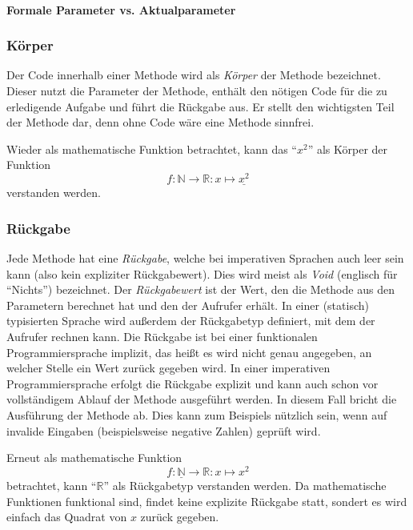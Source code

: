 		\paragraph{Formale Parameter vs. Aktualparameter}
	
	\subsubsection{Körper} \functionalMark \imperativeMark \oopMark
		Der Code innerhalb einer Methode wird als \textit{Körper} der Methode bezeichnet. Dieser nutzt die Parameter der Methode, enthält den nötigen Code für die zu erledigende Aufgabe und führt die Rückgabe aus. Er stellt den wichtigsten Teil der Methode dar, denn ohne Code wäre eine Methode sinnfrei.
		
		Wieder als mathematische Funktion betrachtet, kann das \enquote{\( x ^ 2 \)} als Körper der Funktion \[ f : \mathbb{N} \rightarrow \mathbb{R} : x \mapsto \underline{x ^ 2} \] verstanden werden.
	
	\subsubsection{Rückgabe} \functionalMark \imperativeMark \oopMark
		Jede Methode hat eine \textit{Rückgabe}, welche bei imperativen Sprachen auch leer sein kann (also kein expliziter Rückgabewert). Dies wird meist als \textit{Void} (englisch für \enquote{Nichts}) bezeichnet. Der \textit{Rückgabewert} ist der Wert, den die Methode aus den Parametern berechnet hat und den der Aufrufer erhält. In einer (statisch) typisierten Sprache wird außerdem der Rückgabetyp definiert, mit dem der Aufrufer rechnen kann. Die Rückgabe ist bei einer funktionalen Programmiersprache implizit, das heißt es wird nicht genau angegeben, an welcher Stelle ein Wert zurück gegeben wird. In einer imperativen Programmiersprache erfolgt die Rückgabe explizit und kann auch schon vor vollständigem Ablauf der Methode ausgeführt werden. In diesem Fall bricht die Ausführung der Methode ab. Dies kann zum Beispiels nützlich sein, wenn auf invalide Eingaben (beispielsweise negative Zahlen) geprüft wird.
		
		Erneut als mathematische Funktion \[ f : \underline{\mathbb{N}} \rightarrow \mathbb{R} : x \mapsto x ^ 2 \] betrachtet, kann \enquote{\(\mathbb{R}\)} als Rückgabetyp verstanden werden. Da mathematische Funktionen funktional sind, findet keine explizite Rückgabe statt, sondert es wird einfach das Quadrat von \(x\) zurück gegeben.

